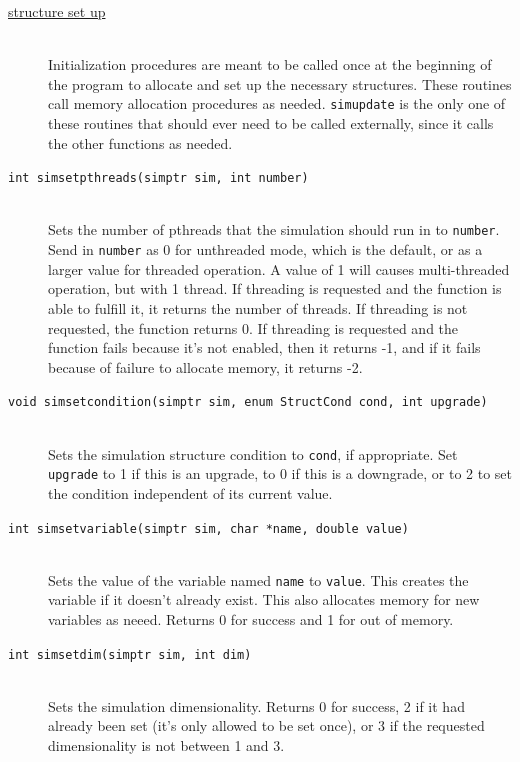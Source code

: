 \documentclass {scrbook}
\newcommand {\ttt} {\texttt}
\begin{document}
\begin{description}
\item[\underline{structure set up}]
\hfill \\

Initialization procedures are meant to be called once at the beginning of the program to allocate and set up the necessary structures. These routines call memory allocation procedures as needed. \ttt{simupdate} is the only one of these routines that should ever need to be called externally, since it calls the other functions as needed.

\item[\ttt{int simsetpthreads(simptr sim, int number)}]
\hfill \\
Sets the number of pthreads that the simulation should run in to \ttt{number}. Send in \ttt{number} as 0 for unthreaded mode, which is the default, or as a larger value for threaded operation. A value of 1 will causes multi-threaded operation, but with 1 thread. If threading is requested and the function is able to fulfill it, it returns the number of threads. If threading is not requested, the function returns 0. If threading is requested and the function fails because it's not enabled, then it returns -1, and if it fails because of failure to allocate memory, it returns -2.

\item[\ttt{void simsetcondition(simptr sim, enum StructCond cond, int upgrade)}]
\hfill \\
Sets the simulation structure condition to \ttt{cond}, if appropriate. Set \ttt{upgrade} to 1 if this is an upgrade, to 0 if this is a downgrade, or to 2 to set the condition independent of its current value.

\item[\ttt{int simsetvariable(simptr sim, char *name, double value)}]
\hfill \\
Sets the value of the variable named \ttt{name} to \ttt{value}. This creates the variable if it doesn't already exist. This also allocates memory for new variables as neeed. Returns 0 for success and 1 for out of memory.

\item[\ttt{int simsetdim(simptr sim, int dim)}]
\hfill \\
Sets the simulation dimensionality. Returns 0 for success, 2 if it had already been set (it's only allowed to be set once), or 3 if the requested dimensionality is not between 1 and 3.


\end{description}
\end{document}
